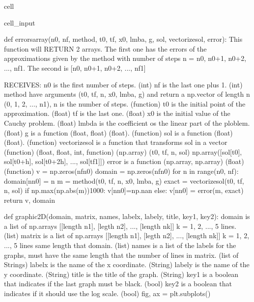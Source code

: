 \documentclass[letterpaper,10pt,english]{jupyterBook}
\begin{document}
\begin{sphinxuseclass}{cell}
\begin{sphinxVerbatimInput}
\begin{sphinxuseclass}{cell_input}
\begin{sphinxVerbatim}[commandchars=\\\{\}]
def errors\PYGZus{}array(n0, nf, method, t0, tf, x0, lmba, g, sol, vectorize\PYGZus{}sol, error):
  \PYGZsq{}\PYGZsq{}\PYGZsq{}
  This function will RETURN 2 arrays.
  The first one has the errors of the approximations given by the method with
  number of steps n = n0, n0+1, n0+2, ..., nf\PYGZhy{}1.
  The second is [n0, n0+1, n0+2, ..., nf\PYGZhy{}1]

  RECEIVES:
  n0 is the first number of steps. (int)
  nf is the last one plus 1. (int)
  method have arguments (t0, tf, n, x0, lmba, g) and return a
  np.vector of length n (0, 1, 2, ..., n\PYGZhy{}1), n is the number of steps. (function)
  t0 is the initial point of the approximation. (float)
  tf is the last one. (float)
  x0 is the initial value of the Cauchy problem. (float)
  lmbda is the coefficient os the linear part of the ploblem. (float)
  g is a function (float, float) \PYGZhy{}\PYGZgt{} (float). (function)
  sol is a function (float) \PYGZhy{}\PYGZgt{} (float). (function)
  vectorize\PYGZus{}sol is a function that \PYGZdq{}transforms sol in a vector\PYGZdq{} (function)
  (float, float, int, function) \PYGZhy{}\PYGZgt{} (np.array)
  (t0, tf, n, sol) \PYGZhy{}\PYGZgt{} np.array([sol[t0], sol[t0+h], sol[t0+2h], ..., sol[tf\PYGZhy{}1]])
  error is a function (np.array, np.array) \PYGZhy{}\PYGZgt{} (float) (function)
  \PYGZsq{}\PYGZsq{}\PYGZsq{}
  v = np.zeros(nf\PYGZhy{}n0)
  domain = np.zeros(nf\PYGZhy{}n0)
  for n in range(n0, nf):
    domain[n\PYGZhy{}n0] = n
    m = method(t0, tf, n, x0, lmba, g)
    exact = vectorize\PYGZus{}sol(t0, tf, n, sol)
    if np.max(np.abs(m))\PYGZgt{}1000:
        v[n\PYGZhy{}n0]=np.nan
    else:
        v[n\PYGZhy{}n0] = error(m, exact)
  return v, domain

def graphic\PYGZus{}2D(domain, matrix, names, labelx, labely, title, key1, key2):
  \PYGZsq{}\PYGZsq{}\PYGZsq{}
  domain is a list of np.arrays [[length n1], [legth n2], ..., [length nk]]
  k = 1, 2, ..., 5 lines. (list)
  matrix is a list of np.arrays [[length n1], [legth n2], ..., [length nk]]
  k = 1, 2, ..., 5 lines \PYGZhy{} same length that domain. (list)
  names is a list of the labels for the graphs, must have the same length that
  the number of lines in matrix. (list of Strings)
  labelx is the name of the x coordinate. (String)
  labely is the name of the y coordinate. (String)
  title is the title of the graph. (String)
  key1 is a boolean that indicates if the last graph must be black. (bool)
  key2 is a boolean that indicates if it should use the log scale. (bool)
  \PYGZsq{}\PYGZsq{}\PYGZsq{}
  fig, ax = plt.subplots()


\end{sphinxVerbatim}
\end{sphinxuseclass}
\end{sphinxVerbatimInput}
\end{sphinxuseclass}
\end{document}
